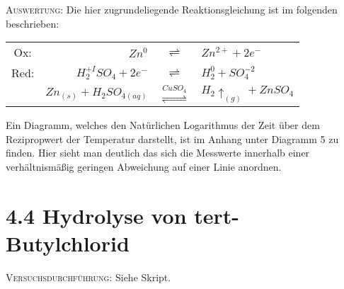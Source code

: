\documentclass[11pt, a4paper]{article}
\begin{document}
\textsc{Auswertung:}\hspace{8mm} Die hier zugrundeliegende Reaktionsgleichung ist im folgenden beschrieben:
\begin{center}
\begin{tabular}{crcl}
Ox: & $Zn^0$ & $\rightleftharpoons$ & $Zn^{2+}+2e^-$\\
Red: & $H_2^{+I}SO_4 + 2e^-$ & $\rightleftharpoons$ & $H_2^0 + SO_4^{-2}$\\
\hline
 & $Zn_{(s)} + H_2SO_{4(aq)}$ & $\stackrel{CuSO_4}{\rightleftharpoons}$ & $H_{2}\uparrow_{(g)} + ZnSO_4$\\
\end{tabular}
\end{center}
Ein Diagramm, welches den Natürlichen Logarithmus der Zeit über dem Rezipropwert der Temperatur darstellt, ist im Anhang unter Diagramm 5 zu finden. Hier sieht man deutlich das sich die Messwerte innerhalb einer verhältnismäßig geringen Abweichung auf einer Linie anordnen.
\newpage
\section{4.4 Hydrolyse von tert-Butylchlorid}

\textsc{Versuchsdurchführung:} Siehe Skript.\\
\end{document}
